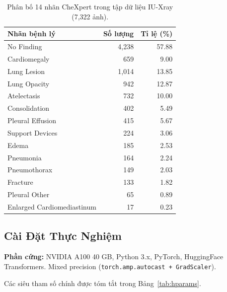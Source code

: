 \documentclass[12pt, a4paper]{article}
\begin{document}
\begin{table}[H]
  \centering
  \caption{Phân bố 14 nhãn CheXpert trong tập dữ liệu IU-Xray (7,322 ảnh).}
  \label{tab:label_dist}
  \begin{tabular}{lrr}
    \toprule
    \textbf{Nhãn bệnh lý} & \textbf{Số lượng} & \textbf{Tỉ lệ (\%)} \\
    \midrule
    No Finding              & 4,238 & 57.88 \\
    Cardiomegaly            &   659 &  9.00 \\
    Lung Lesion             & 1,014 & 13.85 \\
    Lung Opacity            &   942 & 12.87 \\
    Atelectasis             &   732 & 10.00 \\
    Consolidation           &   402 &  5.49 \\
    Pleural Effusion        &   415 &  5.67 \\
    Support Devices         &   224 &  3.06 \\
    Edema                   &   185 &  2.53 \\
    Pneumonia               &   164 &  2.24 \\
    Pneumothorax            &   149 &  2.03 \\
    Fracture                &   133 &  1.82 \\
    Pleural Other           &    65 &  0.89 \\
    Enlarged Cardiomediastinum &  17 &  0.23 \\
    \bottomrule
  \end{tabular}
\end{table}

\subsection{Cài Đặt Thực Nghiệm}
\label{sec:setup}

\textbf{Phần cứng:} NVIDIA A100 40 GB, Python 3.x, PyTorch, HuggingFace
Transformers. Mixed precision (\texttt{torch.amp.autocast + GradScaler}).

Các siêu tham số chính được tóm tắt trong Bảng~\ref{tab:hparams}.
\end{document}

